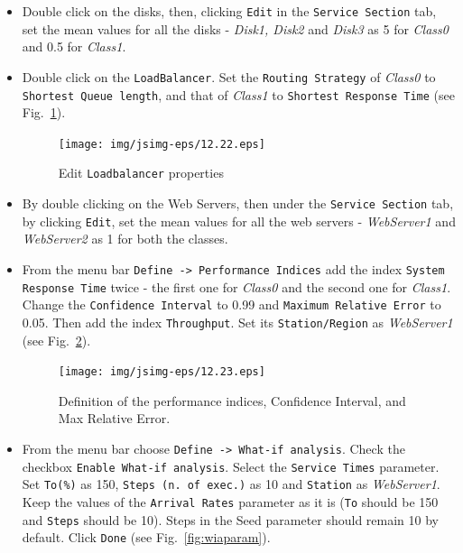 \begin{itemize}
\item Double click on the disks, then, clicking \texttt{Edit} in
the \texttt{Service Section} tab, set the mean values for all the
disks - \emph{Disk1, Disk2} and \emph{Disk3} as 5 for
\emph{Class0} and 0.5 for \emph{Class1}.

\item Double click on the \texttt{LoadBalancer}. Set the
\texttt{Routing Strategy} of \emph{Class0} to \texttt{Shortest
Queue length}, and that of \emph{Class1} to \texttt{Shortest
Response Time} (see Fig.~\ref{fig:loadbalprop}).
\begin{figure}[htb]
    \begin{center}
        \texttt{[image: img/jsimg-eps/12.22.eps]}
    \end{center}
    \caption{Edit \texttt{Loadbalancer} properties}
    \label{fig:loadbalprop}
\end{figure}
\item By double clicking on the Web Servers, then under the
\texttt{Service Section} tab, by clicking \texttt{Edit}, set the
mean values for all the web servers - \emph{WebServer1} and
\emph{WebServer2} as 1 for both the classes. \item From the menu
bar \texttt{Define -> Performance Indices} add the index
\texttt{System Response Time} twice - the first one for
\emph{Class0} and the second one for \emph{Class1}. Change the
\texttt{Confidence Interval} to 0.99 and \texttt{Maximum Relative
Error} to 0.05. Then add the index \texttt{Throughput}. Set its
\texttt{Station/Region} as \emph{WebServer1} (see
Fig.~\ref{fig:conintmaxer}).
\begin{figure}[htb]
    \begin{center}
        \texttt{[image: img/jsimg-eps/12.23.eps]}
    \end{center}
    \caption{Definition of the performance indices,
    Confidence Interval, and Max Relative Error.}
    \label{fig:conintmaxer}
\end{figure}
\item From the menu bar choose \texttt{Define -> What-if
analysis}. Check the checkbox \texttt{Enable What-if analysis}.
Select the \texttt{Service Times} parameter. Set \texttt{To(\%)}
as 150, \texttt{Steps (n. of exec.)} as 10 and \texttt{Station} as
\emph{WebServer1}. Keep the values of the \texttt{Arrival Rates}
parameter as it is (\texttt{To} should be 150 and \texttt{Steps}
should be 10). Steps in the Seed parameter should remain 10 by
default. Click \texttt{Done} (see Fig.~\ref{fig:wiaparam}).

\end{itemize}
